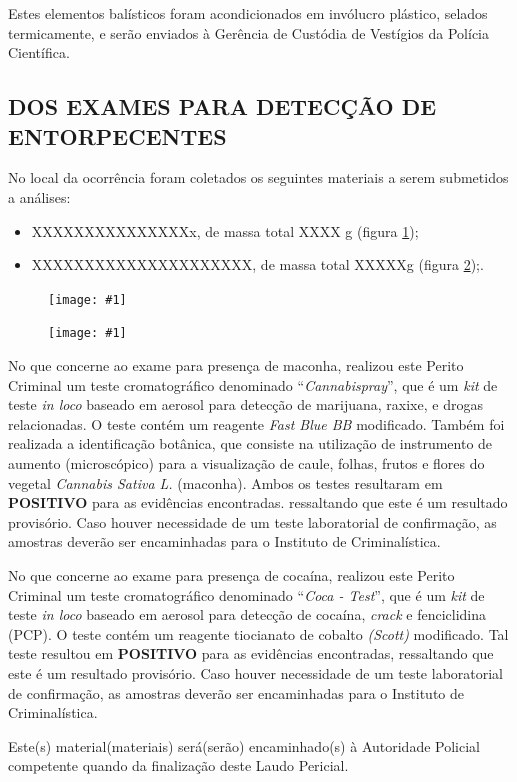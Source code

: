 \documentclass[a4paper,12pt,oneside]{article}
\newcommand{\fig}[3]{       %
	\begin{figure}[H]
		\centering
		\texttt{[image: \#1]}
		\settowidth{\imgwidth}{\texttt{[image: \#1]}}
		\captionsetup{width=\imgwidth}
		\caption{#2}
		\label{#3}
	\end{figure}
}
\newcommand{\f}[2]{\fig{#1.jpg}{#2}{#1}}
\newlength{\imgwidth}                     %
\newcounter{c}
\newcounter{d}
\newcounter{u}
\begin{document}
Estes elementos balísticos foram acondicionados em invólucro plástico, selados termicamente, e serão enviados à Gerência de Custódia de Vestígios da Polícia Científica.


\subsection{DOS EXAMES PARA DETECÇÃO DE ENTORPECENTES}

No local da ocorrência foram coletados os seguintes materiais a serem submetidos a análises:

\begin{itemize}
	\item XXXXXXXXXXXXXXXx, de massa total XXXX g (figura \ref{entorp1});
	\item XXXXXXXXXXXXXXXXXXXXX, de massa total XXXXXg (figura \ref{entorp2});.
\end{itemize} 

\f{entorp1}{}
\f{entorp2}{}

No que concerne ao exame para presença de maconha, realizou este Perito Criminal um teste cromatográfico denominado ``{\sl Cannabispray}'', que é um {\sl kit} de teste {\sl in loco} baseado em aerosol para detecção de marijuana, raxixe, e drogas relacionadas. O teste contém um reagente {\sl Fast Blue BB} modificado. Também foi realizada a identificação botânica, que consiste na utilização de instrumento de aumento (microscópico) para a visualização de caule, folhas, frutos e flores do vegetal {\sl Cannabis Sativa L.} (maconha). Ambos os testes resultaram em \textbf{POSITIVO} para as evidências encontradas. ressaltando que este é um resultado provisório. Caso houver necessidade de um teste laboratorial de confirmação, as amostras deverão ser encaminhadas para o Instituto de Criminalística.

No que concerne ao exame para presença de cocaína, realizou este Perito Criminal um teste cromatográfico denominado ``{\sl Coca - Test}'', que é um {\sl kit} de teste {\sl in loco} baseado em aerosol para detecção de cocaína, {\sl crack} e fenciclidina (PCP). O teste contém um reagente tiocianato de cobalto {\sl(Scott)} modificado. Tal teste resultou em \textbf{POSITIVO} para as evidências encontradas, ressaltando que este é um resultado provisório. Caso houver necessidade de um teste laboratorial de confirmação, as amostras deverão ser encaminhadas para o Instituto de Criminalística.

Este(s) material(materiais) será(serão) encaminhado(s) à Autoridade Policial competente quando da finalização deste Laudo Pericial.
\end{document}

